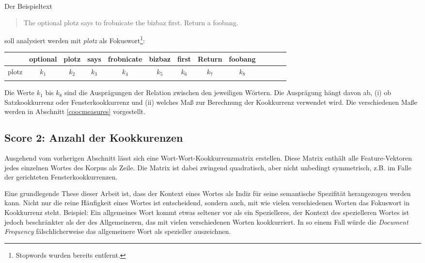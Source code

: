 \documentclass[11pt,numbers=noenddot]{scrartcl}
\begin{document}
\noindent Der Beispieltext
\begin{quote}
    The optional plotz says to frobnicate the bizbaz first. Return a foobang.
\end{quote}
soll analysiert werden mit \emph{plotz} als Fokuswort\footnote{Stopwords wurden bereits entfernt.}:

\begin{table}[h]
    \begin{center}
        \begin{tabular}{ l | *{12}{c}}
                 & optional & plotz & says & frobnicate & bizbaz & first & Return & foobang \\ \hline
            plotz & $k_{1}$ & $k_{2}$ & $k_{3}$ & $k_{4}$ & $k_{5}$ & $k_{6}$ & $k_{7}$ & $k_{8}$ \\ \\
        \end{tabular}
    \end{center}
\end{table}

Die Werte $k_1$ bis $k_8$ sind die Ausprägungen der Relation zwischen den jeweiligen Wörtern. Die Ausprägung hängt davon ab, (i) ob Satzkookkurrenz oder Fensterkookkurrenz und (ii) welches Maß zur Berechnung der Kookkurrenz verwendet wird. Die verschiedenen Maße werden in Abschnitt \ref{coocmeasures} vorgestellt.

\subsection{Score 2: Anzahl der Kookkurenzen} \label{nzds}

Ausgehend vom vorherigen Abschnitt lässt sich eine Wort-Wort-Kookkurrenzmatrix erstellen. Diese Matrix enthält alle Feature-Vektoren jedes einzelnen Wortes des Korpus als Zeile. Die Matrix ist dabei zwingend quadratisch, aber nicht unbedingt symmetrisch, z.B. im Falle der gerichteten Fensterkookkurrenzen.

Eine grundlegende These dieser Arbeit ist, dass der Kontext eines Wortes als Indiz für seine semantische Spezifität herangezogen werden kann. Nicht nur die reine Häufigkeit eines Wortes ist entscheidend, sondern auch, mit wie vielen verschiedenen Worten das Fokuswort in Kookkurrenz steht. Beispiel: Ein allgemeines Wort kommt etwas seltener vor als ein Spezielleres, der Kontext des spezielleren Wortes ist jedoch beschränkter als der des Allgemeineren, das mit vielen verschiedenen Worten kookkurriert. In so einem Fall würde die \emph{Document Frequency} fälschlicherweise das allgemeinere Wort als spezieller auszeichnen.
\end{document}
